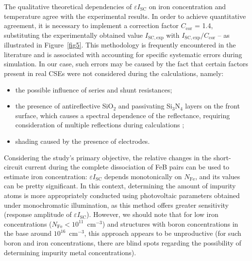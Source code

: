 \documentclass[a4paper,fleqn]{cas-sc}
\begin{document}
The qualitative theoretical dependencies of $\varepsilon I_\mathrm{SC}$ on iron concentration and temperature agree with the experimental results. In order to achieve quantitative agreement, it is necessary to implement a correction factor $C_\mathrm{cor}$ = 1.4, substituting the experimentally obtained value $I_\mathrm{SC,exp}$ with $I_\mathrm{SC,exp} / C_\mathrm{cor}$ – as illustrated in Figure~\ref{fig5}. This methodology is frequently encountered in the literature \cite{IronSC} and is associated with accounting for specific systematic errors during simulation. In our case, such errors may be caused by the fact that certain factors present in real CSEs were not considered during the calculations, namely:
\begin{itemize}
    \item the possible influence of series and shunt resistances;
    \item the presence of antireflective SiO$_2$ and passivating Si$_3$N$_4$ layers on the front surface, which causes a spectral dependence of the reflectance, requiring consideration of multiple reflections during calculations \cite{KostRefl2000};
    \item shading caused by the presence of electrodes.
\end{itemize}

Considering the study's primary objective, the relative changes in the short-circuit current during the complete dissociation of FeB pairs can be used to estimate iron concentration: $\varepsilon I_\mathrm{SC}$ depends monotonically on $N_\mathrm{Fe}$, and its values can be pretty significant. In this context, determining the amount of impurity atoms is more appropriately conducted using photovoltaic parameters obtained under monochromatic illumination, as this method offers greater sensitivity (response amplitude of $\varepsilon I_\mathrm{SC}$). However, we should note that for low iron concentrations ($N_\mathrm{Fe}<10^{11}$~cm$^{-3}$) and structures with boron concentrations in the base around $10^{16}$~cm$^{-3}$, this approach appears to be unproductive (for such boron and iron concentrations, there are blind spots regarding the possibility of determining impurity metal concentrations).
\end{document}
